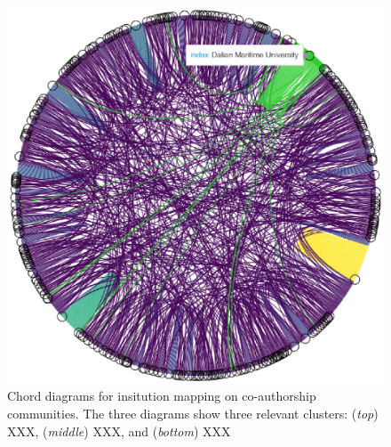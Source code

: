 \documentclass[a4paper, review, endfloat, authoryear]{elsarticle}
\begin{document}
\begin{figure}[htbp]
		\includegraphics[scale=0.8]{pics/coauthorship_inst_chord_3.eps}
		\caption{Chord diagrams for insitution mapping on co-authorship communities. The three diagrams show three relevant clusters: (\textit{top}) XXX, (\textit{middle}) XXX, and (\textit{bottom}) XXX}\label{fig:fig6}
	\end{figure}
\end{document}
